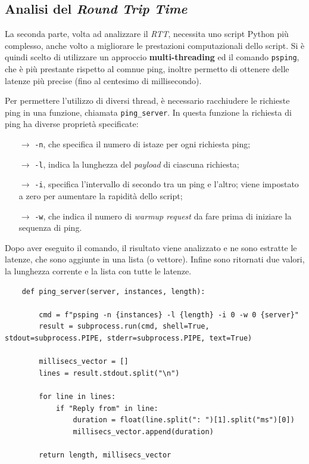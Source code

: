 \vspace{15px}\subsection{Analisi del \textsl{Round Trip Time}}\label{RTT}

La seconda parte, volta ad analizzare il \textsl{RTT}, necessita uno script Python più complesso, anche volto a migliorare le prestazioni computazionali dello script. Si è quindi scelto di utilizzare un approccio \textbf{multi-threading} ed il comando \texttt{psping}, che è più prestante rispetto al comnue ping, inoltre permetto di ottenere delle latenze più precise (fino al centesimo di millisecondo).

Per permettere l'utilizzo di diversi thread, è necessario racchiudere le richieste ping in una funzione, chiamata \texttt{ping\_server}. In questa funzione la richiesta di ping ha diverse proprietà specificate:
\vspace{-3px}
\begin{itemize}
    \setlength{\itemsep}{-2px}
    \item[$\to$] \texttt{-n}, che specifica il numero di istaze per ogni richiesta ping;
    \item[$\to$] \texttt{-l}, indica la lunghezza del \textsl{payload} di ciascuna richiesta;
    \item[$\to$] \texttt{-i}, specifica l'intervallo di secondo tra un ping e l'altro; viene impostato a zero per aumentare la rapidità dello script;
    \item[$\to$] \texttt{-w}, che indica il numero di \textsl{warmup request} da fare prima di iniziare la sequenza di ping.
\end{itemize}
\noindent Dopo aver eseguito il comando, il risultato viene analizzato e ne sono estratte le latenze, che sono aggiunte in una lista (o vettore). Infine sono ritornati due valori, la lunghezza corrente e la lista con tutte le latenze.

\begin{lstlisting}
    def ping_server(server, instances, length):

        cmd = f"psping -n {instances} -l {length} -i 0 -w 0 {server}"
        result = subprocess.run(cmd, shell=True, stdout=subprocess.PIPE, stderr=subprocess.PIPE, text=True)

        millisecs_vector = []
        lines = result.stdout.split("\n")
        
        for line in lines:
            if "Reply from" in line:
                duration = float(line.split(": ")[1].split("ms")[0])
                millisecs_vector.append(duration)
        
        return length, millisecs_vector
\end{lstlisting}

